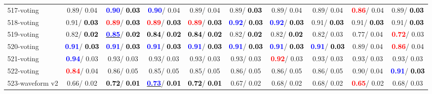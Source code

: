 \begin{table}[h]
\begin{center}
{\begin{tabular}{lc|c|c|c|c|c|c|c|c}
517-voting &   0.89/  0.04 & \textcolor{blue}{\textbf{  0.90}}/\textcolor{black}{\textbf{  0.03}} & \textcolor{blue}{\textbf{  0.90}}/  0.04 &   0.89/  0.04 &   0.89/\textcolor{black}{\textbf{  0.03}} &   0.89/  0.04 &   0.89/  0.04 & \textcolor{red}{\textbf{  0.86}}/  0.04 &   0.89/\textcolor{black}{\textbf{  0.03}} \\
518-voting &   0.91/\textcolor{black}{\textbf{  0.03}} & \textcolor{red}{\textbf{  0.89}}/\textcolor{black}{\textbf{  0.03}} & \textcolor{red}{\textbf{  0.89}}/\textcolor{black}{\textbf{  0.03}} & \textcolor{red}{\textbf{  0.89}}/\textcolor{black}{\textbf{  0.03}} & \textcolor{blue}{\textbf{  0.92}}/\textcolor{black}{\textbf{  0.03}} & \textcolor{blue}{\textbf{  0.92}}/\textcolor{black}{\textbf{  0.03}} &   0.91/\textcolor{black}{\textbf{  0.03}} &   0.91/\textcolor{black}{\textbf{  0.03}} &   0.91/\textcolor{black}{\textbf{  0.03}} \\
519-voting &   0.82/\textcolor{black}{\textbf{  0.02}} & \underline{\textcolor{blue}{\textbf{  0.85}}}/\textcolor{black}{\textbf{  0.02}} & \textcolor{black}{\textbf{  0.84}}/\textcolor{black}{\textbf{  0.02}} & \textcolor{black}{\textbf{  0.84}}/\textcolor{black}{\textbf{  0.02}} &   0.82/\textcolor{black}{\textbf{  0.02}} &   0.82/\textcolor{black}{\textbf{  0.02}} &   0.82/  0.03 &   0.77/  0.04 & \textcolor{red}{\textbf{  0.72}}/  0.03 \\ \hline
520-voting & \textcolor{blue}{\textbf{  0.91}}/\textcolor{black}{\textbf{  0.03}} & \textcolor{blue}{\textbf{  0.91}}/\textcolor{black}{\textbf{  0.03}} & \textcolor{blue}{\textbf{  0.91}}/\textcolor{black}{\textbf{  0.03}} & \textcolor{blue}{\textbf{  0.91}}/\textcolor{black}{\textbf{  0.03}} & \textcolor{blue}{\textbf{  0.91}}/\textcolor{black}{\textbf{  0.03}} & \textcolor{blue}{\textbf{  0.91}}/\textcolor{black}{\textbf{  0.03}} & \textcolor{blue}{\textbf{  0.91}}/\textcolor{black}{\textbf{  0.03}} &   0.89/  0.04 & \textcolor{red}{\textbf{  0.86}}/  0.04 \\
521-voting & \textcolor{blue}{\textbf{  0.94}}/  0.03 &   0.93/  0.03 &   0.93/  0.03 &   0.93/  0.03 &   0.93/  0.03 & \textcolor{red}{\textbf{  0.92}}/  0.03 &   0.93/  0.03 &   0.93/  0.03 &   0.93/  0.03 \\
522-voting & \textcolor{red}{\textbf{  0.84}}/  0.04 &   0.86/  0.05 &   0.85/  0.05 &   0.85/  0.05 &   0.86/  0.05 &   0.86/  0.05 &   0.86/  0.05 &   0.90/  0.04 & \textcolor{blue}{\textbf{  0.91}}/\textcolor{black}{\textbf{  0.03}} \\
523-waveform v2 &   0.66/  0.02 & \textcolor{black}{\textbf{  0.72}}/\textcolor{black}{\textbf{  0.01}} & \underline{\textcolor{blue}{\textbf{  0.73}}}/\textcolor{black}{\textbf{  0.01}} & \textcolor{black}{\textbf{  0.72}}/\textcolor{black}{\textbf{  0.01}} &   0.67/  0.02 &   0.68/  0.02 &   0.68/  0.02 & \textcolor{red}{\textbf{  0.65}}/  0.02 &   0.68/  0.03 \\

\end{tabular}}
\end{center}
\end{table}
